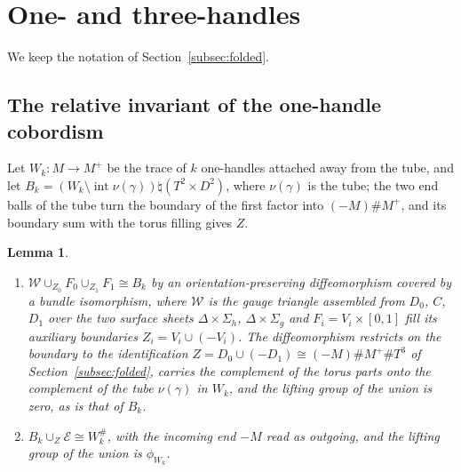 \documentclass[11pt]{amsart}
\newtheorem{lemma}[theorem]{Lemma}
\theoremstyle{definition}
\theoremstyle{remark}
\theoremstyle{plain}
\numberwithin{equation}{section}
\begin{document}
\section{One- and three-handles}\label{sec:one-three}

We keep the notation of Section~\ref{subsec:folded}.

\subsection{The relative invariant of the one-handle cobordism}\label{subsec:one-handle-invariant}

Let $W_k\colon M\to M^+$ be the trace of $k$ one-handles attached away from the
tube, and let $B_k=(W_k\setminus\operatorname{int}\nu(\gamma))\natural(T^2\times D^2)$, where
$\nu(\gamma)$ is the tube; the two end balls of the tube turn the boundary of the
first factor into $(-M)\#M^+$, and its boundary sum with the torus filling gives
$Z$.

\begin{lemma}\label{lem:Bk-topology}
\begin{enumerate}[label=(\roman*)]
\item $\mathscr W\cup_{Z_0}F_0\cup_{Z_1}F_1\cong B_k$ by an orientation-preserving
  diffeomorphism covered by a bundle isomorphism, where $\mathscr W$ is the gauge
  triangle assembled from $D_0$, $C$, $D_1$ over the two surface sheets
  $\Delta\times\Sigma_h$, $\Delta\times\Sigma_g$ and $F_i=V_i\times[0,1]$ fill its auxiliary boundaries
  $Z_i=V_i\cup(-V_i)$. The diffeomorphism restricts on the boundary to the
  identification $Z=D_0\cup(-D_1)\cong(-M)\#M^+\#T^3$ of Section~\ref{subsec:folded},
  carries the complement of the torus parts onto the complement of the tube
  $\nu(\gamma)$ in $W_k$, and the lifting group of the union is zero, as is
  that of $B_k$.
\item $B_k\cup_Z\mathcal E\cong W_k^\#$, with the incoming end $-M$ read as outgoing,
  and the lifting group of the union is $\phi_{W_k}$.
\end{enumerate}
\end{lemma}
\end{document}

